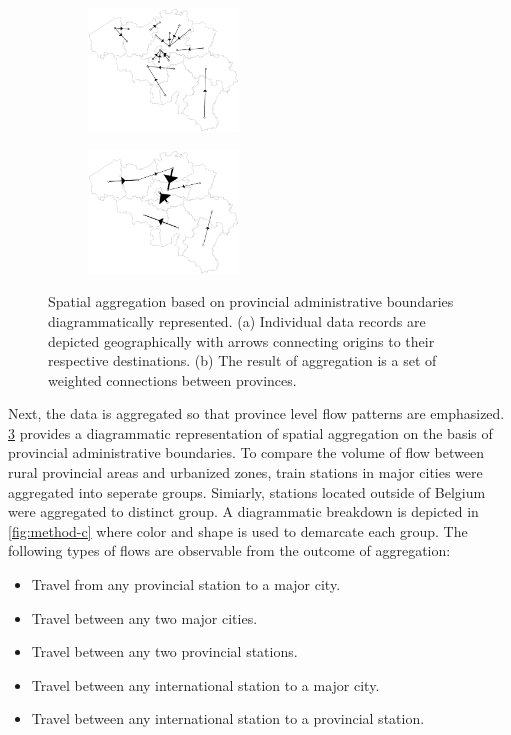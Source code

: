 \documentclass{sig-alternate}
\begin{document}
\begin{figure}[h]
  \centering
  \begin{subfigure}{.2375\textwidth}
    \includegraphics[width=4cm]{method-a.pdf}\\
    \subcaption{} %
    \label{fig:method-a}
  \end{subfigure}%
  \begin{subfigure}{.2375\textwidth}
    \includegraphics[width=4cm]{method-b.pdf}\\
    \subcaption{} %
    \label{fig:method-b}
  \end{subfigure}%
  \vspace{5.0pt}%
  \caption{Spatial aggregation based on provincial administrative boundaries diagrammatically represented. (a) Individual data records are depicted geographically with arrows connecting origins to their respective destinations. (b) The result of aggregation is a set of weighted connections between provinces.}
  \label{fig:method-ab}
\end{figure}

Next, the data is aggregated so that province level flow patterns are emphasized.
\cref{fig:method-ab} provides a diagrammatic representation of spatial aggregation on the basis of provincial administrative boundaries.
To compare the volume of flow between rural provincial areas and urbanized zones, train stations in major cities were aggregated into seperate groups. 
Simiarly, stations located outside of Belgium were aggregated to distinct group. 
A diagrammatic breakdown is depicted in \cref{fig:method-c} where color and shape is used to demarcate each group.
The following types of flows are observable from the outcome of aggregation:

\begin{itemize}
  \item Travel from any provincial station to a major city.
  \item Travel between any two major cities.
  \item Travel between any two provincial stations.
  \item Travel between any international station to a major city.
  \item Travel between any international station to a provincial station.
\end{itemize}
\end{document}
